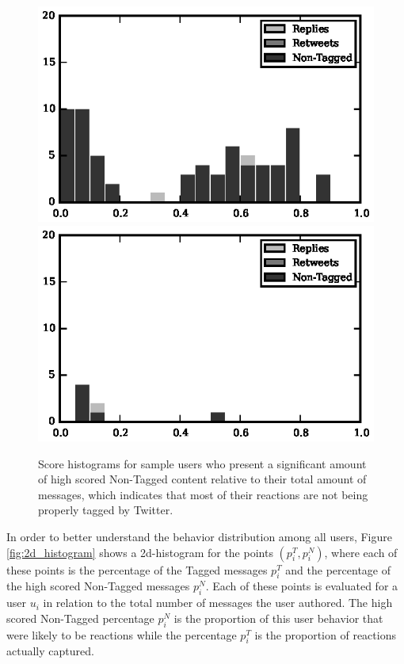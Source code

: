 \begin{figure}[!tb]
\includegraphics[scale=0.9]{./figures/87339782_histogram.eps}
\includegraphics[scale=0.9]{./figures/196322186_histogram.eps}
\caption{Score histograms for sample users who present a significant amount of high scored Non-Tagged content relative to their total amount of messages, which indicates that most of their reactions are not being properly tagged by Twitter.}
\label{fig:users_reponse_histograms}
\end{figure}


In order to better understand the behavior distribution among all users, Figure \ref{fig:2d_histogram} shows a 2d-histogram for the points $(p_i^T, p_i^N)$, where each of these points is the percentage of the Tagged messages $p_i^T$ and the percentage of the high scored Non-Tagged messages $p_i^N$.  Each of these points is evaluated for a user $u_i$ in relation to the total number of messages the user authored.
The high scored Non-Tagged percentage $p_i^N$ is the proportion of this user behavior that were likely to be reactions while the percentage $p_i^T$ is the proportion of reactions actually captured.


